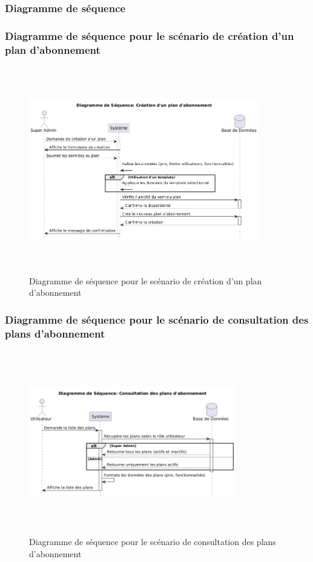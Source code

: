 \subsubsection{Diagramme de séquence}

\subsubsection{Diagramme de séquence pour le scénario de création d'un plan d'abonnement}
\begin{figure}[H]
    \centering
    \includegraphics[width=10cm,height=9cm]{images/createplanseq.png}
    \caption{Diagramme de séquence pour le scénario de création d'un plan d'abonnement}
\end{figure}

\subsubsection{Diagramme de séquence pour le scénario de consultation des plans d'abonnement}
\begin{figure}[H]
    \centering
    \includegraphics[width=9cm,height=8cm]{images/consultplanseq.png}
    \caption{Diagramme de séquence pour le scénario de consultation des plans d'abonnement}
\end{figure}

